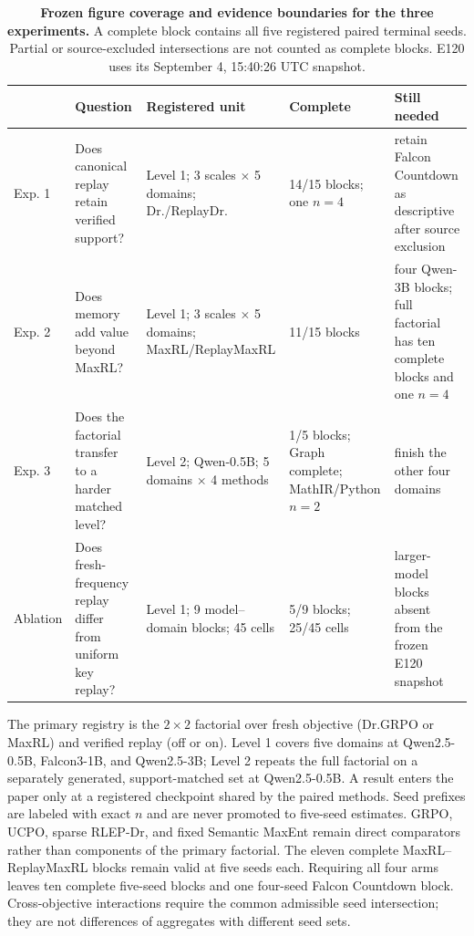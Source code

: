 \documentclass{article}
\newcommand{\1}{\mathbf 1}
\theoremstyle{remark}
\theoremstyle{definition}
\theoremstyle{plain}
\begin{document}
\begin{table}[H]
  \centering
  \caption{\textbf{Frozen figure coverage and evidence boundaries for the three
  experiments.} A complete block contains all five registered paired
  terminal seeds. Partial or source-excluded intersections are not counted as complete blocks.
  E120 uses its September 4, 15:40:26 UTC snapshot.}
  \label{tab:experiment-map}
  \scriptsize
  \setlength{\tabcolsep}{3pt}
  \begin{tabularx}{\linewidth}{@{}P{.09\linewidth}P{.27\linewidth}P{.25\linewidth}P{.15\linewidth}Y@{}}
    \toprule
    & \textbf{Question} & \textbf{Registered unit} & \textbf{Complete} &
      \textbf{Still needed} \\
    \midrule
    Exp. 1 & Does canonical replay retain verified support? &
      Level 1; 3 scales $\times$ 5 domains; Dr./ReplayDr. &
      14/15 blocks; one $n=4$ & retain Falcon Countdown as descriptive after source exclusion \\
    Exp. 2 & Does memory add value beyond MaxRL? &
      Level 1; 3 scales $\times$ 5 domains; MaxRL/ReplayMaxRL &
      11/15 blocks & four Qwen-3B blocks; full factorial has ten complete blocks and one $n=4$ \\
    Exp. 3 & Does the factorial transfer to a harder matched level? &
      Level 2; Qwen-0.5B; 5 domains $\times$ 4 methods &
      1/5 blocks; Graph complete; MathIR/Python \(n=2\) & finish the other four domains \\
    Ablation & Does fresh-frequency replay differ from uniform key replay? &
      Level 1; 9 model--domain blocks; 45 cells &
      5/9 blocks; 25/45 cells & larger-model blocks absent from the frozen E120 snapshot \\
    \bottomrule
  \end{tabularx}
\end{table}


The primary registry is the $2\times2$ factorial over fresh objective
(Dr.GRPO or MaxRL) and verified replay (off or on). Level 1 covers five domains
at Qwen2.5-0.5B, Falcon3-1B, and Qwen2.5-3B; Level 2 repeats the full factorial
on a separately generated, support-matched set at Qwen2.5-0.5B. A result enters
the paper only at a registered checkpoint shared by the paired methods. Seed
prefixes are labeled with exact $n$ and are never promoted to five-seed
estimates. GRPO, UCPO, sparse RLEP-Dr, and fixed Semantic MaxEnt remain direct
comparators rather than components of the primary factorial. The eleven complete
MaxRL--ReplayMaxRL blocks remain valid at five seeds each. Requiring all four
arms leaves ten complete five-seed blocks and one four-seed Falcon Countdown
block. Cross-objective interactions require the common admissible seed
intersection; they are not differences of aggregates with different seed sets.
\end{document}
